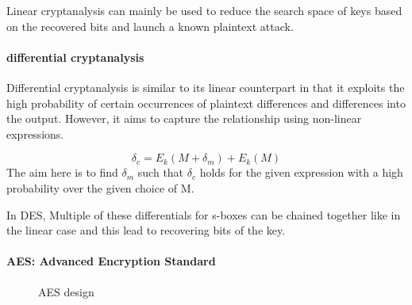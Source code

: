 Linear cryptanalysis can mainly be used to reduce the search space of keys based on the recovered bits and launch a known plaintext attack.

\paragraph{differential cryptanalysis}
Differential cryptanalysis is similar to its linear counterpart in that it exploits the high probability of certain occurrences of plaintext
differences and differences into the output. However, it aims to capture the relationship using non-linear expressions.

\[ \delta_c = E_k(M + \delta_m) + E_k(M) \] 
The aim here is to find \( \delta_m \) such that \( \delta_c \) holds for the given expression with a high probability over the given choice of M. \newline

In DES, Multiple of these differentials for s-boxes can be chained together like in the linear case and this lead to recovering bits of the key.


\paragraph{AES: Advanced Encryption Standard}

\begin{wrapfigure}{r}{2.3in}
\center
{}

\caption{AES design}
\label{fig:aesDesign}
\end{wrapfigure}



